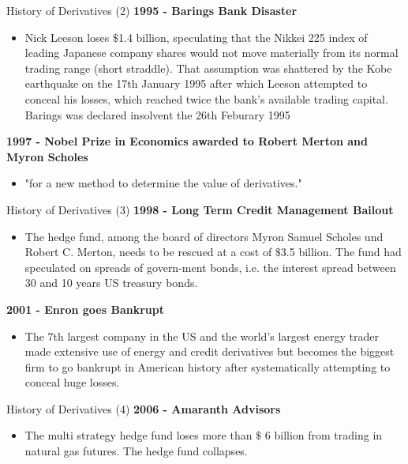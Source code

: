 {History of Derivatives (2)}
\textbf{1995 - Barings Bank Disaster }
\begin{itemize}
  \item Nick Leeson loses $\$$1.4 billion, speculating that the Nikkei 225 index of leading Japanese company shares would not move materially from its normal trading range (short straddle). That assumption was shattered by the Kobe earthquake on the 17th January 1995 after which Leeson attempted to conceal his losses, which reached twice the bank's available trading capital. Barings was declared insolvent the 26th Feburary 1995
\end{itemize}
\textbf{1997 - Nobel Prize in Economics awarded to Robert Merton and Myron Scholes}
\begin{itemize}
  \item "for a new method to determine the value of derivatives."
\end{itemize}



{History of Derivatives (3)}
\textbf{1998 - Long Term Credit Management Bailout}
\begin{itemize}
  \item The hedge fund, among the board of directors Myron Samuel Scholes und Robert C. Merton, needs to be rescued at a cost of $\$$3.5 billion. The fund had speculated on spreads of govern-ment bonds, i.e. the interest spread between 30 and 10 years US treasury bonds.
\end{itemize}
\textbf{2001 - Enron goes Bankrupt}
\begin{itemize}
  \item The 7th largest company in the US and the world's largest energy trader made extensive use of energy and credit derivatives but becomes the biggest firm to go bankrupt in American history after systematically attempting to conceal huge losses.
\end{itemize}



{History of Derivatives (4)}
\textbf{2006 - Amaranth Advisors}
\begin{itemize}
  \item The multi strategy hedge fund loses more than $\$$ 6 billion from trading in natural gas futures. The hedge fund collapses.
\end{itemize}


